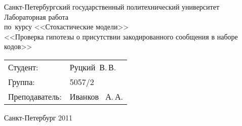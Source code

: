 %
%

\begin{titlepage} %

\begin{center} %

\large Санкт-Петербургский государственный политехнический университет\\[5.5cm]

\huge Лабораторная работа\\[0.6cm] %
\large по~курсу <<Стохастические модели>>\\[1cm]
\large <<Проверка гипотезы о присутствии закодированного сообщения в наборе кодов>>\\[6cm]

\begin{flushright} %
\begin{tabular}{l l}
Студент: & Руцкий~В.\,В.\\
Группа: & 5057/2\\
Преподаватель: & Иванков ~А.\,А.
\end{tabular}
\end{flushright} %

\vfill %

{\large Санкт-Петербург 2011}
\end{center} %
\thispagestyle{empty} %
\end{titlepage} %
